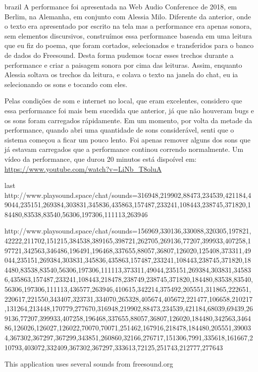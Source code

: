 \begin{otherlanguage*}{brazil}
A performance foi apresentada na Web Audio Conference de 2018, em Berlim, na Alemanha, em conjunto com Alessia Milo. Diferente da anterior, onde o texto era apresentado por escrito na tela mas a performance era apenas sonora, sem elementos discursivos, construímos essa performance baseada em uma leitura que eu fiz do poema, que foram cortados, selecionados e transferidos para o banco de dados do Freesound. Desta forma pudemos tocar esses trechos durante a performance e criar a paisagem sonora por cima das leituras. Assim, enquanto Alessia soltava os trechos da leitura, e colava o texto na janela do chat, eu ia selecionando os sons e tocando com eles. 

Pelas condições de som e internet no local, que eram excelentes, considero que essa performance foi mais bem sucedida que anterior, já que não houveram bugs e os sons foram carregados rápidamente. Em um momento, por volta da metade da performance, quando abri uma quantidade de sons considerável, senti que o sistema começou a ficar um pouco lento. Foi apenas remover alguns dos sons que já estavam carregados que a performance continou correndo normalmente. Um vídeo da performance, que durou 20 minutos está dispoível em: \url{https://www.youtube.com/watch?v=LiNb_T8oluA}

last
http://www.playsound.space/chat/sounds=316948,219902,88473,234539,421184,49044,235151,269384,303831,345836,435863,157487,233241,108443,238745,371820,184480,83538,83540,56306,197306,111113,263946

http://www.playsound.space/chat/sounds=156969,330136,330088,320305,197821,42222,211702,151215,384538,389165,398721,262705,269136,77207,399933,407258,197721,342563,346486,196491,196468,337655,88057,36807,126020,125408,373311,49044,235151,269384,303831,345836,435863,157487,233241,108443,238745,371820,184480,83538,83540,56306,197306,111113,373311,49044,235151,269384,303831,345836,435863,157487,233241,108443,218478,238749,238745,371820,184480,83538,83540,56306,197306,111113,436577,263946,410615,342214,375492,205551,311865,222651,220617,221550,343407,323731,334070,265328,405674,405672,221477,106658,210217,131264,213448,170779,277670,316948,219902,88473,234539,421184,68039,69439,269136,77207,399933,407258,196468,337655,88057,36807,126020,184480,342563,346486,126026,126027,126022,70070,70071,251462,167916,218478,184480,205551,390034,367302,367297,367299,343851,260860,32166,276717,151306,7991,335618,161667,210793,403072,332409,367302,367297,333613,72125,251743,212777,277643

This application uses several sounds from freesound.org


\end{otherlanguage*}
